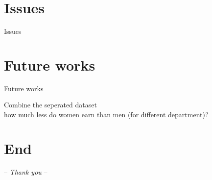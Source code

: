 \documentclass[xcolor=dvipsnames]{beamer}
\begin{document}
\section{Issues}
		\begin{frame}{\vskip 0.05cm\centerline{\Huge\textcolor{bscuro}{Issues}}}

\end{frame}			
		

\section{Future works}
		\begin{frame}{\vskip 0.05cm\centerline{\Huge\textcolor{bscuro}{Future works}}}
Combine the seperated dataset\\
how much less do women earn than men (for different department)? 
\end{frame}		
	
\section{End}
	\begin{frame}
	\centerline{\Huge\textcolor{bscuro}{ -- \emph{Thank you} -- }}
\end{frame}
\end{document}
